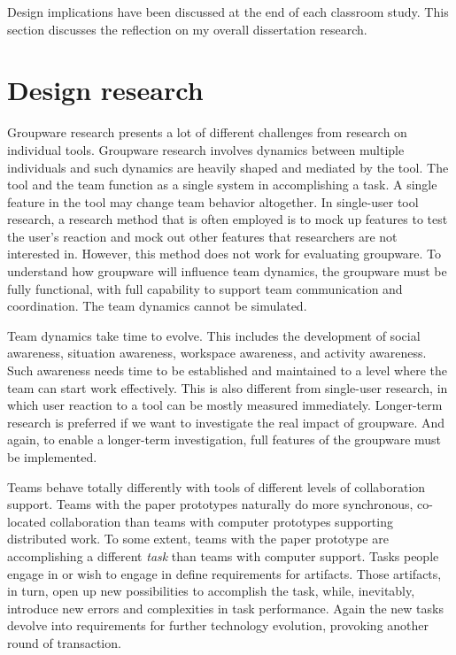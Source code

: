 Design implications have been discussed at the end of each classroom study. This section discusses the reflection on my overall dissertation research.

\section{Design research}

Groupware research presents a lot of different challenges from research on individual tools. Groupware research involves dynamics between multiple individuals and such dynamics are heavily shaped and mediated by the tool. The tool and the team function as a single system in accomplishing a task. A single feature in the tool may change team behavior altogether. In single-user tool research, a research method that is often employed is to mock up features to test the user's reaction and mock out other features that researchers are not interested in. However, this method does not work for evaluating groupware. To understand how groupware will influence team dynamics, the groupware must be fully functional, with full capability to support team communication and coordination. The team dynamics cannot be simulated. 

Team dynamics take time to evolve. This includes the development of social awareness, situation awareness, workspace awareness, and activity awareness. Such awareness needs time to be established and maintained to a level where the team can start work effectively. This is also different from single-user research, in which user reaction to a tool can be mostly measured immediately. Longer-term research is preferred if we want to investigate the real impact of groupware. And again, to enable a longer-term investigation, full features of the groupware must be implemented. 

Teams behave totally differently with tools of different levels of collaboration support. Teams with the paper prototypes naturally do more synchronous, co-located collaboration than teams with computer prototypes supporting distributed work. To some extent, teams with the paper prototype are accomplishing a different \emph{task} than teams with computer support. 
Tasks people engage in or wish to engage in define requirements for artifacts. Those artifacts, in turn, open up new possibilities to accomplish the task, while, inevitably, introduce new errors and complexities in task performance. Again the new tasks devolve into requirements for further technology evolution, provoking another round of transaction. 

